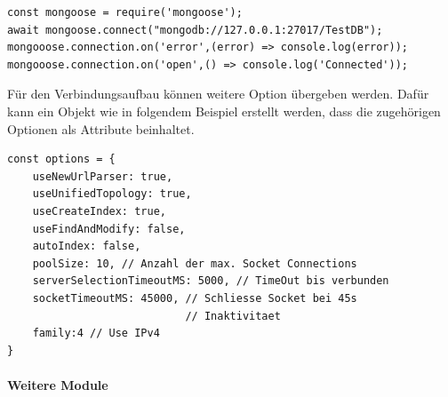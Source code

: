 \begin{lstlisting}[caption=Mongoose: Verbindung zur Datenbank aufbauen,
label=lst:MongooseConnect]
const mongoose = require('mongoose');
await mongoose.connect("mongodb://127.0.0.1:27017/TestDB");
mongooose.connection.on('error',(error) => console.log(error));
mongooose.connection.on('open',() => console.log('Connected'));
\end{lstlisting}


\noindent
Für den Verbindungsaufbau können weitere Option übergeben werden. Dafür kann ein Objekt wie in folgendem Beispiel erstellt werden, dass die zugehörigen Optionen als Attribute beinhaltet. 
\newline

\begin{lstlisting}[caption=Mongoose Verbindungsoptionen -nodejs 3.3- ,label=lst:MongooseConnect]
const options = {
	useNewUrlParser: true,
	useUnifiedTopology: true,
	useCreateIndex: true,
	useFindAndModify: false,
	autoIndex: false,
	poolSize: 10, // Anzahl der max. Socket Connections
	serverSelectionTimeoutMS: 5000, // TimeOut bis verbunden
	socketTimeoutMS: 45000, // Schliesse Socket bei 45s                 
	                        // Inaktivitaet
	family:4 // Use IPv4
}
\end{lstlisting}


\paragraph{Weitere Module}

